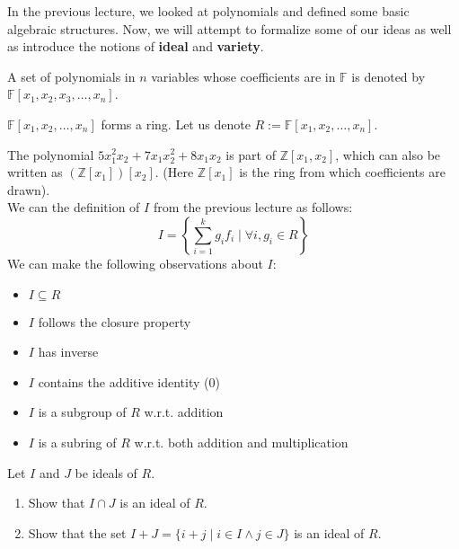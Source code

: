 
In the previous lecture, we looked at polynomials and defined some basic algebraic structures. Now, we will attempt to formalize some of our ideas as well as introduce the notions of \textbf{ideal} and \textbf{variety}.\\

\begin{notation}
A set of polynomials in $n$ variables whose coefficients are in $\mathbb{F}$ is denoted by $\mathbb{F}[x_1,x_2,x_3,\dots,x_n]$.
\end{notation}


\begin{observation}
$\mathbb{F}[x_1,x_2,\ldots,x_n]$ forms a ring. Let us denote $R:=\mathbb{F}[x_1,x_2,\ldots,x_n]$.
\end{observation}

The polynomial $5x_1^2x_2 + 7x_1x_2^2 + 8x_1x_2$ is part of $\mathbb{Z}[x_1,x_2]$, which can also be written as $(\mathbb{Z}[x_1])[x_2]$. (Here $\mathbb{Z}[x_1]$ is the ring from which coefficients are drawn).\\

We can the definition of $I$ from the previous lecture as follows:
\begin{equation}
I = \left\lbrace \sum\limits_{i=1}^{k} g_{i}f_{i}\mid \forall i, g_i \in R\right\rbrace
\end{equation}
We can make the following observations about $I$:
\begin{itemize}
\item $I \subseteq R$
\item $I$ follows the closure property
\item $I$ has inverse
\item $I$ contains the additive identity (0)
\item $I$ is a subgroup of $R$ w.r.t. addition
\item $I$ is a subring of $R$ w.r.t. both addition and multiplication\\
\end{itemize}

\begin{exercise}

Let $I$ and $J$ be ideals of $R$.
\begin{enumerate}
\item Show that $I \cap J$ is an ideal of $R$.
\item Show that the set $I+J = \{i+j \mid i \in I \land j \in J \}$ is an ideal of $R$.
\end{enumerate}
\end{exercise}


